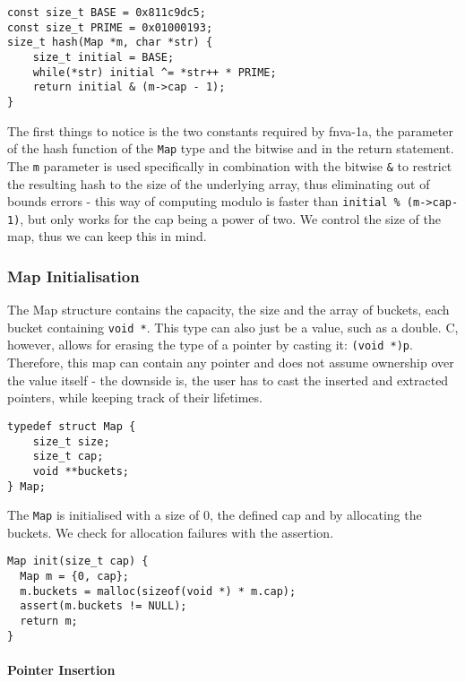     \begin{verbatim}
const size_t BASE = 0x811c9dc5;
const size_t PRIME = 0x01000193;
size_t hash(Map *m, char *str) {
    size_t initial = BASE;
    while(*str) initial ^= *str++ * PRIME;
    return initial & (m->cap - 1);
}
    \end{verbatim}

    The first things to notice is the two constants required by
    fnva-1a, the parameter of the hash function of the \texttt{Map}
    type and the bitwise and in the return statement. The \texttt{m}
    parameter is used specifically in combination with the bitwise
    \texttt{\&} to restrict the resulting hash to the size of the
    underlying array, thus eliminating out of bounds errors - this way
    of computing modulo is faster than \texttt{initial \% (m->cap-1)},
    but only works for the cap being a power of two. We
    control the size of the map, thus we can keep this in mind.
    \subsubsection*{Map Initialisation}

    The Map structure contains the capacity, the size and the array of buckets,
    each bucket containing \texttt{void *}. This type can also just be a
    value, such as a double. C, however, allows for erasing the type of a
    pointer by casting it: \texttt{(void *)p}. Therefore, this map can
    contain any pointer and does not assume ownership over the value itself -
    the downside is, the user has to cast the inserted and extracted pointers,
    while keeping track of their lifetimes.

    \begin{verbatim}
typedef struct Map { 
    size_t size;
    size_t cap;
    void **buckets; 
} Map;
    \end{verbatim}

    The \texttt{Map} is initialised with a size of $0$, the defined cap and by
    allocating the buckets. We check for allocation failures with the
    assertion.

    \begin{verbatim}
Map init(size_t cap) {
  Map m = {0, cap};
  m.buckets = malloc(sizeof(void *) * m.cap);
  assert(m.buckets != NULL);
  return m;
}
    \end{verbatim}
    \paragraph*{Pointer Insertion}

